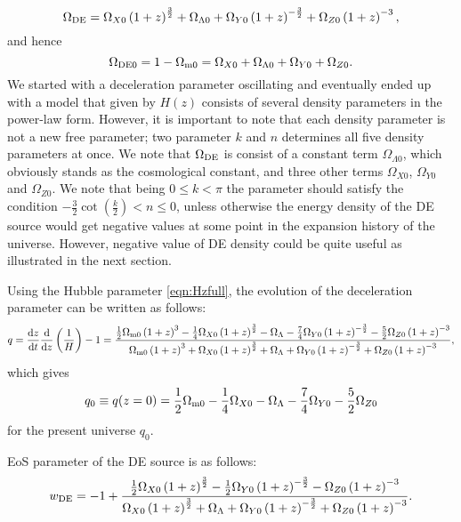 \documentclass[11pt,a4paper]{article}
\begin{document}
\begin{equation}
\Omega_{\rm DE}=\Omega_{X0}\left(1+z\right)^{\frac{3}{2}}+\Omega_{\Lambda 0}+\Omega_{Y0}\left(1+z\right)^{-\frac{3}{2}}+\Omega_{Z0}\left(1+z\right)^{-3},
\end{equation}
and hence
\begin{equation}
\Omega_{{\rm DE}0}=1-\Omega_{{\rm m}0}=\Omega_{X0}+\Omega_{\Lambda 0}+\Omega_{Y0}+\Omega_{Z0}.
\end{equation}
We started with a deceleration parameter oscillating and eventually ended up with a model that given by $H(z)$ consists of several density parameters in the power-law form. However, it is important to note that each density parameter is not a new free parameter; two parameter $k$ and $n$ determines all five density parameters at once. We note that $\Omega_{\rm DE}$ is consist of a constant term $\Omega_{\Lambda 0}$, which obviously stands as the cosmological constant, and three other terms $\Omega_{X0}$, $\Omega_{Y0}$ and $\Omega_{Z0}$. We note that being $0\leq k < \pi$ the parameter should satisfy the condition $-\frac{3}{2}\cot\left(\frac{k}{2}\right)<n\leq 0$, unless otherwise the energy density of the DE source would get negative values at some point in the expansion history of the universe. However, negative value of DE density could be quite useful as illustrated in the next section.

Using the Hubble parameter \eqref{eqn:Hzfull}, the evolution of the deceleration parameter can be written as follows:
\begin{equation}
q=\frac{{\rm d}z}{{\rm d}t}\frac{{\rm d}}{{\rm d}z}\left(\frac{1}{H}\right)-1=\frac{\frac{1}{2}\Omega_{\rm m0}\left(1+z\right)^{3}-\frac{1}{4}\Omega_{X0}\left(1+z\right)^{\frac{3}{2}}-\Omega_{\Lambda}-\frac{7}{4}\Omega_{Y0}\left(1+z\right)^{-\frac{3}{2}}-\frac{5}{2}\Omega_{Z0}\left(1+z\right)^{-3}}{\Omega_{\rm m0}\left(1+z\right)^{3}+\Omega_{X0}\left(1+z\right)^{\frac{3}{2}}+\Omega_{\Lambda}+\Omega_{Y0}\left(1+z\right)^{-\frac{3}{2}}+\Omega_{Z0}\left(1+z\right)^{-3}},
\end{equation}
which gives
\begin{equation}
q_0\equiv q(z=0)=\frac{1}{2}\Omega_{\rm m0}-\frac{1}{4}\Omega_{X0}-\Omega_{\Lambda}-\frac{7}{4}\Omega_{Y0}-\frac{5}{2}\Omega_{Z0}
\end{equation}
for the present universe $q_{0}$.

EoS parameter of the DE source is as follows:
\begin{equation}
w_{\rm DE}=-1+\frac{\frac{1}{2}\Omega_{X0}\left(1+z\right)^{\frac{3}{2}}-\frac{1}{2}\Omega_{Y0}\left(1+z\right)^{-\frac{3}{2}}-\Omega_{Z0}\left(1+z\right)^{-3}}{\Omega_{X0}\left(1+z\right)^{\frac{3}{2}}+\Omega_{\Lambda}+\Omega_{Y0}\left(1+z\right)^{-\frac{3}{2}}+\Omega_{Z0}\left(1+z\right)^{-3}}.
\end{equation}
\end{document}

